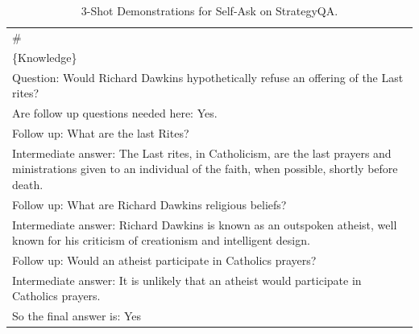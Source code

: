\begin{table}[t!]
{\begin{tabular}{p{\textwidth}}
\#\\
\{Knowledge\}\\
Question: Would Richard Dawkins hypothetically refuse an offering of the Last rites?\\
Are follow up questions needed here: Yes.\\
Follow up: What are the last Rites?\\
Intermediate answer: The Last rites, in Catholicism, are the last prayers and ministrations given to an individual of the faith, when possible, shortly before death.\\
Follow up: What are Richard Dawkins religious beliefs?\\
Intermediate answer: Richard Dawkins is known as an outspoken atheist, well known for his criticism of creationism and intelligent design.\\
Follow up: Would an atheist participate in Catholics prayers?\\
Intermediate answer: It is unlikely that an atheist would participate in Catholics prayers.\\
So the final answer is: Yes\\
\bottomrule
\end{tabular}
}
\caption{3-Shot Demonstrations for Self-Ask on StrategyQA.}\label{tab:StrategyQA-self-ask}
\end{table}
\endgroup

